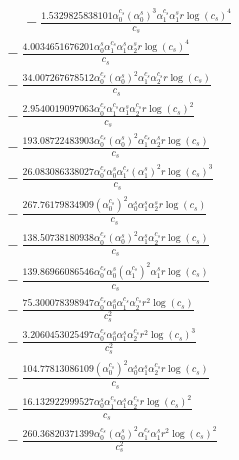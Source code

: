 \documentclass[10pt]{article}
\begin{document}
\begin{align*}
\phantom{R_{3,9}} &\phantom{={}}{}  - \frac{1.5329825838101 \alpha_{0}^{c_s} \left(\alpha_{0}^s\right)^{3} \alpha_{1}^{c_s} \alpha_{1}^s r \log{\left(c_{s} \right)}^{4}}{c_{s}} \\
&{}  - \frac{4.0034651676201 \alpha_{0}^s \alpha_{1}^{c_s} \alpha_{1}^s \alpha_{2}^s r \log{\left(c_{s} \right)}^{4}}{c_{s}} \\
&{}  - \frac{34.007267678512 \alpha_{0}^{c_s} \left(\alpha_{0}^s\right)^{2} \alpha_{1}^{c_s} \alpha_{2}^{c_s} r \log{\left(c_{s} \right)}}{c_{s}} \\
&{}  - \frac{2.9540019097063 \alpha_{0}^{c_s} \alpha_{1}^{c_s} \alpha_{1}^s \alpha_{2}^{c_s} r \log{\left(c_{s} \right)}^{2}}{c_{s}} \\
&{}  - \frac{193.08722483903 \alpha_{0}^{c_s} \left(\alpha_{0}^s\right)^{2} \alpha_{1}^{c_s} \alpha_{2}^s r \log{\left(c_{s} \right)}}{c_{s}} \\
&{}  - \frac{26.083086338027 \alpha_{0}^{c_s} \alpha_{0}^s \alpha_{1}^{c_s} \left(\alpha_{1}^s\right)^{2} r \log{\left(c_{s} \right)}^{3}}{c_{s}} \\
&{}  - \frac{267.76179834909 \left(\alpha_{0}^{c_s}\right)^{2} \alpha_{0}^s \alpha_{1}^s \alpha_{2}^s r \log{\left(c_{s} \right)}}{c_{s}} \\
&{}  - \frac{138.50738180938 \alpha_{0}^{c_s} \left(\alpha_{0}^s\right)^{2} \alpha_{1}^s \alpha_{2}^{c_s} r \log{\left(c_{s} \right)}}{c_{s}} \\
&{}  - \frac{139.86966086546 \alpha_{0}^{c_s} \alpha_{0}^s \left(\alpha_{1}^{c_s}\right)^{2} \alpha_{1}^s r \log{\left(c_{s} \right)}}{c_{s}} \\
&{}  - \frac{75.300078398947 \alpha_{0}^{c_s} \alpha_{0}^s \alpha_{1}^{c_s} \alpha_{2}^{c_s} r^{2} \log{\left(c_{s} \right)}}{c_{s}^{2}} \\
&{}  - \frac{3.2060453025497 \alpha_{0}^{c_s} \alpha_{0}^s \alpha_{1}^s \alpha_{2}^{c_s} r^{2} \log{\left(c_{s} \right)}^{3}}{c_{s}^{2}} \\
&{}  - \frac{104.77813086109 \left(\alpha_{0}^{c_s}\right)^{2} \alpha_{0}^s \alpha_{1}^s \alpha_{2}^{c_s} r \log{\left(c_{s} \right)}}{c_{s}} \\
&{}  - \frac{16.132922999527 \alpha_{0}^s \alpha_{1}^{c_s} \alpha_{1}^s \alpha_{2}^{c_s} r \log{\left(c_{s} \right)}^{2}}{c_{s}} \\
&{}  - \frac{260.36820371399 \alpha_{0}^{c_s} \left(\alpha_{0}^s\right)^{2} \alpha_{1}^{c_s} \alpha_{1}^s r^{2} \log{\left(c_{s} \right)}^{2}}{c_{s}^{2}} \\

\end{align*}
\end{document}
